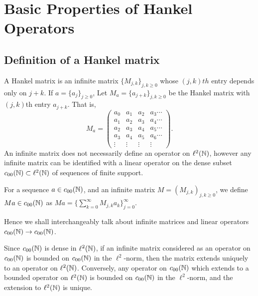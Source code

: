 
\chapter{Basic Properties of Hankel Operators} %

\label{Chapter3} %




\section{Definition of a Hankel matrix}
A Hankel matrix is an infinite matrix $\{M_{j,k}\}_{j,k \geq 0}$
whose $(j,k)th$ entry depends only on $j+k$. If $a = \{a_j\}_{j\geq 0}$,
Let $M_a = \{a_{j+k}\}_{j,k\geq 0}$ be the Hankel matrix with $(j,k)$th
entry $a_{j+k}$. That is,
\begin{equation*}
    M_a = \begin{pmatrix}
        a_0 & a_1 & a_2 & a_3 \cdots\\
        a_1 & a_2 & a_3 & a_4 \cdots\\
        a_2 & a_3 & a_4 & a_5 \cdots\\
        a_3 & a_4 & a_5 & a_6 \cdots\\
        \vdots & \vdots & \vdots & \vdots 
    \end{pmatrix}.
\end{equation*}
An infinite matrix does not necessarily define an operator on $\ell^2(\mathbb{N})$, 
however any infinite matrix can be identified with a linear operator 
on the dense subset $c_{00}(\mathbb{N}) \subset \ell^2(\mathbb{N})$ of sequences
of finite support. 

For a sequence $a \in c_{00}(\mathbb{N})$, and an infinite matrix $M = (M_{j,k})_{j,k\geq 0}$, 
we define $Ma \in c_{00}(\mathbb{N})$ as $Ma = \{\sum_{k=0}^\infty M_{j,k}a_k\}_{j=0}^\infty$.

Hence we shall interchangeably talk about infinite matrices and linear
operators $c_{00}(\mathbb{N})\rightarrow c_{00}(\mathbb{N})$.

Since $c_{00}(\mathbb{N})$ is dense in $\ell^2(\mathbb{N})$, if an infinite matrix
considered as an operator on $c_{00}(\mathbb{N})$ is bounded on $c_{00}(\mathbb{N})$
in the $\ell^2$-norm, then the matrix extends uniquely to an operator on $\ell^2(\mathbb{N})$.
Conversely, any operator on $c_{00}(\mathbb{N})$ which extends to a bounded
operator on $\ell^2(\mathbb{N})$ is bounded on $c_{00}(\mathbb{N})$ in the $\ell^2$-norm,
and the extension to $\ell^2(\mathbb{N})$ is unique.

